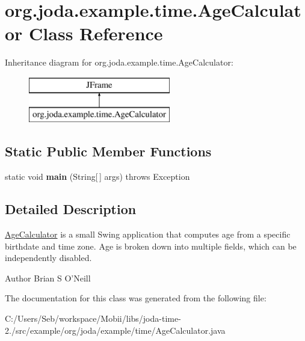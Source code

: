 \hypertarget{classorg_1_1joda_1_1example_1_1time_1_1_age_calculator}{\section{org.\-joda.\-example.\-time.\-Age\-Calculator Class Reference}
\label{classorg_1_1joda_1_1example_1_1time_1_1_age_calculator}
}
Inheritance diagram for org.\-joda.\-example.\-time.\-Age\-Calculator\-:\begin{figure}[H]
\begin{center}
\leavevmode
\includegraphics[height=2.000000cm]{classorg_1_1joda_1_1example_1_1time_1_1_age_calculator}
\end{center}
\end{figure}
\subsection*{Static Public Member Functions}
\begin{DoxyCompactItemize}
\item 
\hypertarget{classorg_1_1joda_1_1example_1_1time_1_1_age_calculator_a0f396bbd558ac2f9f19f92843f43cbd1}{static void {\bfseries main} (String\mbox{[}$\,$\mbox{]} args)  throws Exception }\label{classorg_1_1joda_1_1example_1_1time_1_1_age_calculator_a0f396bbd558ac2f9f19f92843f43cbd1}

\end{DoxyCompactItemize}


\subsection{Detailed Description}
\hyperlink{classorg_1_1joda_1_1example_1_1time_1_1_age_calculator}{Age\-Calculator} is a small Swing application that computes age from a specific birthdate and time zone. Age is broken down into multiple fields, which can be independently disabled.

\begin{DoxyAuthor}{Author}
Brian S O'Neill 
\end{DoxyAuthor}


The documentation for this class was generated from the following file\-:\begin{DoxyCompactItemize}
\item 
C\-:/\-Users/\-Seb/workspace/\-Mobii/libs/joda-\/time-\/2./src/example/org/joda/example/time/Age\-Calculator.\-java\end{DoxyCompactItemize}
